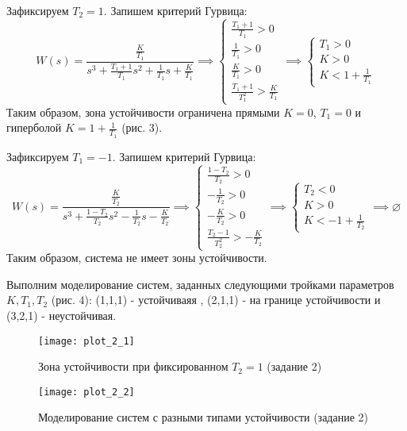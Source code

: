 Зафиксируем $T_2 = 1$. Запишем критерий Гурвица:
\begin{equation*}
    W(s) = \frac{\frac{K}{T_1}}{s^3 + \frac{T_1 + 1}{T_1} s^2 + \frac{1}{T_1}s + \frac{K}{T_1}}
    \implies 
    \begin{cases}
        \frac{T_1 + 1}{T_1} > 0 \\
        \frac{1}{T_1} > 0 \\
        \frac{K}{T_1} > 0 \\
        \frac{T_1 + 1}{T_1 ^ 2} > \frac{K}{T_1}
    \end{cases} \implies
    \begin{cases}
        T_1 > 0 \\
        K > 0 \\
        K < 1 + \frac{1}{T_1}
    \end{cases}
\end{equation*}
Таким образом, зона устойчивости ограничена прямыми $K=0$, $T_1=0$ и гиперболой $K = 1 + \frac{1}{T_1}$ (рис. 3).

Зафиксируем $T_1 = -1$. Запишем критерий Гурвица:
\begin{equation*}
    W(s) = \frac{\frac{K}{T_2}}{s^3 + \frac{1 - T_2}{T_2} s^2 - \frac{1}{T_2}s - \frac{K}{T_2}}
    \implies 
    \begin{cases}
        \frac{1 - T_2}{T_2} > 0 \\
        -\frac{1}{T_2} > 0 \\
        -\frac{K}{T_2} > 0 \\
        \frac{T_2 - 1}{T_2 ^ 2} > -\frac{K}{T_2}
    \end{cases} \implies
    \begin{cases}
        T_2 < 0 \\
        K > 0 \\
        K < -1 + \frac{1}{T_2}
    \end{cases} \implies \varnothing
\end{equation*}
Таким образом, система не имеет зоны устойчивости.

Выполним моделирование систем, заданных следующими тройками параметров $K, T_1, T_2$ (рис. 4): (1,1,1) - устойчиваяя
, (2,1,1) - на границе устойчивости и (3,2,1) - неустойчивая.

\begin{figure}[]
    \centering
    \texttt{[image: plot\_2\_1]}
    \caption{\label{fig:The-caption-1}Зона устойчивости при фиксированном $T_2=1$ (задание 2)}
\end{figure}
\begin{figure}[]
    \centering
    \texttt{[image: plot\_2\_2]}
    \caption{\label{fig:The-caption-1}Моделирование систем с разными типами устойчивости (задание 2)}
\end{figure}
\pagebreak

